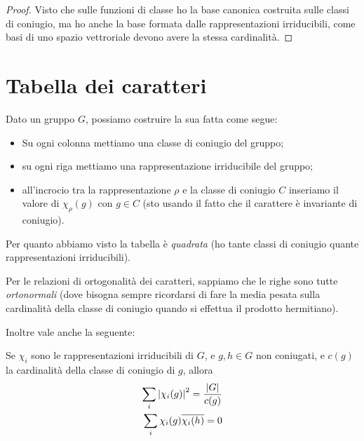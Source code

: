 \documentclass[a4paper,10pt,oneside]{math_article}
\let\conj\overline
\begin{document}
    \begin{proof}
     Visto che sulle funzioni di classe ho la base canonica costruita sulle classi di coniugio, ma ho anche la base formata dalle rappresentazioni irriducibili, come basi di uno spazio vettroriale devono avere la stessa cardinalità.
    \end{proof}

    \section{Tabella dei caratteri}
    
    Dato un gruppo $G$, possiamo costruire la sua  fatta come segue:
    \begin{itemize}
     \item Su ogni colonna mettiamo una classe di coniugio del gruppo;
     \item su ogni riga mettiamo una rappresentazione irriducibile del gruppo;
     \item all'incrocio tra la rappresentazione $\rho$ e la classe di coniugio $C$ inseriamo il valore di $\chi_\rho(g)$ con $g\in C$ (sto usando il fatto che il carattere è invariante di coniugio).
    \end{itemize}

    Per quanto abbiamo visto la tabella è \emph{quadrata} (ho tante classi di coniugio quante rappresentazioni irriducibili).
    
    Per le relazioni di ortogonalità dei caratteri, sappiamo che le righe sono tutte \emph{ortonormali} (dove bisogna sempre ricordarsi di fare la media pesata sulla cardinalità della classe di coniugio quando si effettua il prodotto hermitiano).
    
    Inoltre vale anche la seguente:
    \begin{myprop}
     Se $\chi_i$ sono le rappresentazioni irriducibili di $G$, e $g,h\in G$ non coniugati, e $c(g)$ la cardinalità della classe di coniugio di $g$, allora 
     \begin{align*}
	\sum_i \abs{\chi_i(g)}^2 = \frac {\abs G}{c(g)}\\
	\sum_i \chi_i(g)\conj{\chi_i(h)} = 0
     \end{align*}
    \end{myprop}
\end{document}
